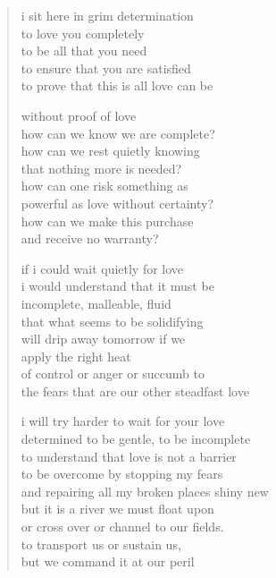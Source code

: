 \begin{verse}
i sit here in grim determination  \\
to love you completely \\
to be all that you need \\
to ensure that you are satisfied \\
to prove that this is all love can be 

without proof of love  \\
how can we know we are complete? \\
how can we rest quietly knowing  \\
that nothing more is needed? \\
how can one risk something as  \\
powerful as love without certainty? \\
how can we make this purchase \\
and receive no warranty?

if i could wait quietly for love \\
i would understand that it must be \\
incomplete, malleable, fluid \\
that what seems to be solidifying \\
will drip away tomorrow if we  \\
apply the right heat \\
of control or anger or succumb to \\
the fears that are our other steadfast love

i will try harder to wait for your love \\
determined to be gentle, to be incomplete \\
to understand that love is not a barrier \\
to be overcome by stopping my fears \\
and repairing all my broken places shiny new \\
but it is a river we must float upon \\
or cross over or channel to our fields. \\
to transport us or sustain us, \\
but we command it at our peril
\end{verse}
